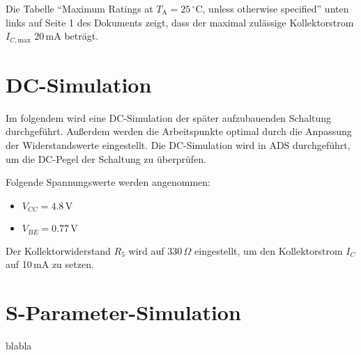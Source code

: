 Die Tabelle \enquote{Maximum Ratings at $T_\mathrm{A}=25\,^\circ\mathrm{C}$, unless otherwise specified} unten links auf Seite 1 des Dokuments zeigt, dass der maximal zulässige Kollektorstrom $I_{C,\mathrm{max}}$ 20\,mA beträgt.
\section{DC-Simulation}
Im folgendem wird eine DC-Simulation der später aufzubauenden Schaltung durchgeführt. 
Außerdem werden die Arbeitspunkte optimal durch die Anpassung der Widerstandswerte eingestellt.
Die DC-Simulation wird in \ac{ADS} durchgeführt, um die DC-Pegel der Schaltung zu überprüfen.

Folgende Spannungswerte werden angenommen:
\begin{itemize}
    \item $V_{CC} = 4.8\,\mathrm{V}$
    \item $V_{BE} = 0.77\,\mathrm{V}$
\end{itemize}

Der Kollektorwiderstand $R_5$ wird auf 330\,$\Omega$ eingestellt, um den Kollektorstrom $I_C$ auf 10\,mA zu setzen.
\section{S-Parameter-Simulation}

blabla
\clearpage
